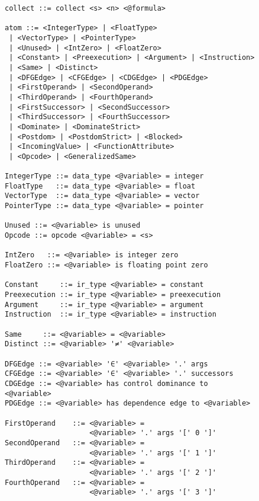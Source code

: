 \begin{figure}[p]
\begin{lstlisting}[language=BNF,basicstyle=\linespread{0.8}\ttfamily,
                   firstnumber=36]
collect ::= collect <s> <n> <@formula>

atom ::= <IntegerType> | <FloatType>
 | <VectorType> | <PointerType>
 | <Unused> | <IntZero> | <FloatZero>
 | <Constant> | <Preexecution> | <Argument> | <Instruction>
 | <Same> | <Distinct>
 | <DFGEdge> | <CFGEdge> | <CDGEdge> | <PDGEdge>
 | <FirstOperand> | <SecondOperand>
 | <ThirdOperand> | <FourthOperand>
 | <FirstSuccessor> | <SecondSuccessor>
 | <ThirdSuccessor> | <FourthSuccessor>
 | <Dominate> | <DominateStrict>
 | <Postdom> | <PostdomStrict> | <Blocked>
 | <IncomingValue> | <FunctionAttribute>
 | <Opcode> | <GeneralizedSame>

IntegerType ::= data_type <@variable> = integer
FloatType   ::= data_type <@variable> = float
VectorType  ::= data_type <@variable> = vector
PointerType ::= data_type <@variable> = pointer

Unused ::= <@variable> is unused
Opcode ::= opcode <@variable> = <s>

IntZero   ::= <@variable> is integer zero
FloatZero ::= <@variable> is floating point zero

Constant     ::= ir_type <@variable> = constant
Preexecution ::= ir_type <@variable> = preexecution
Argument     ::= ir_type <@variable> = argument
Instruction  ::= ir_type <@variable> = instruction

Same     ::= <@variable> = <@variable>
Distinct ::= <@variable> '≠' <@variable>

DFGEdge ::= <@variable> '∈' <@variable> '.' args
CFGEdge ::= <@variable> '∈' <@variable> '.' successors
CDGEdge ::= <@variable> has control dominance to <@variable>
PDGEdge ::= <@variable> has dependence edge to <@variable>

FirstOperand    ::= <@variable> =
                    <@variable> '.' args '[' 0 ']'
SecondOperand   ::= <@variable> =
                    <@variable> '.' args '[' 1 ']'
ThirdOperand    ::= <@variable> =
                    <@variable> '.' args '[' 2 ']'
FourthOperand   ::= <@variable> =
                    <@variable> '.' args '[' 3 ']'
\end{lstlisting}
\end{figure}

